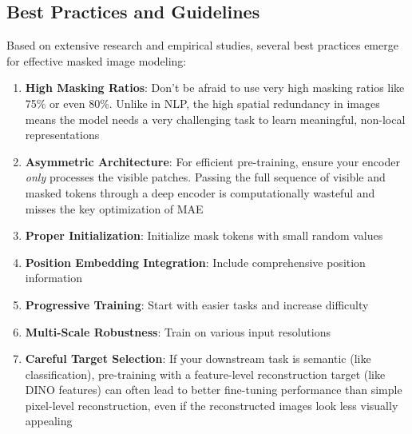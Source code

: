 \subsection{Best Practices and Guidelines}

Based on extensive research and empirical studies, several best practices emerge for effective masked image modeling:

\begin{enumerate}
\item \textbf{High Masking Ratios}: Don't be afraid to use very high masking ratios like 75\% or even 80\%. Unlike in NLP, the high spatial redundancy in images means the model needs a very challenging task to learn meaningful, non-local representations
\item \textbf{Asymmetric Architecture}: For efficient pre-training, ensure your encoder \textit{only} processes the visible patches. Passing the full sequence of visible and masked tokens through a deep encoder is computationally wasteful and misses the key optimization of MAE
\item \textbf{Proper Initialization}: Initialize mask tokens with small random values
\item \textbf{Position Embedding Integration}: Include comprehensive position information
\item \textbf{Progressive Training}: Start with easier tasks and increase difficulty
\item \textbf{Multi-Scale Robustness}: Train on various input resolutions
\item \textbf{Careful Target Selection}: If your downstream task is semantic (like classification), pre-training with a feature-level reconstruction target (like DINO features) can often lead to better fine-tuning performance than simple pixel-level reconstruction, even if the reconstructed images look less visually appealing
\end{enumerate}
\begin{comment}
Feedback: This is a great summary. To make it more actionable:
1.  **High Masking Ratios**: "Don't be afraid to use very high masking ratios like 75%
2.  **Asymmetric Architecture**: "For efficient pre-training, ensure your encoder *only* processes the visible patches. Passing the full sequence of visible and masked tokens through a deep encoder is computationally wasteful and misses the key optimization of MAE."
3.  **Careful Target Selection**: "If your downstream task is semantic (like classification), pre-training with a feature-level reconstruction target (like DINO features) can often lead to better fine-tuning performance than simple pixel-level reconstruction, even if the reconstructed images look less visually appealing."

STATUS: addressed - enhanced all three key recommendations with specific, actionable guidance
\end{comment}

